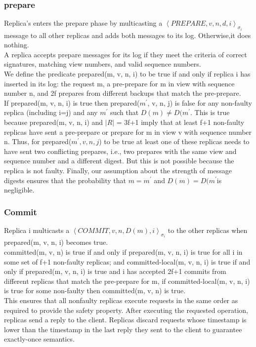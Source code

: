 \documentclass{article}
\begin{document}
\subsubsection{prepare}
Replica's enters the prepare phase by multicasting a $\left\langle PREPARE, v, n, d, i \right\rangle_{\sigma_i} $ message to all other replicas and adds both messages to its log. Otherwise,it does nothing. \\
A replica accepts prepare messages for its log if they meet the criteria of correct signatures, matching view numbers, and valid sequence numbers. \\
We define the predicate prepared(m, v, n, i) to be true
if and only if replica i has inserted in its log: the request
m, a pre-prepare for m in view with sequence number n, and 2f prepares from different backups that match the pre-prepare. \\
If prepared(m, v, n, i) is true then prepared($m^{'}$, v, n, j) is false for any non-faulty replica (including i=j) and any $m^{'}$ such that $D(m) \neq D(m^{'}$. This is true because prepared(m, v, n, i) and $|R|$ = 3f+1 imply that at least f+1 non-faulty replicas
have sent a pre-prepare or prepare for m in view v with
sequence number n. Thus, for prepared($m^{'}, v, n, j$)
to be true at least one of these replicas needs to have
sent two conflicting prepares, i.e., two prepares with the same view and sequence number and a different digest. But this is
not possible because the replica is not faulty. Finally, our
assumption about the strength of message digests ensures
that the probability that $m = m^{'}$ and $D(m) = D(m^{'}$is
negligible.
\subsubsection{Commit}
Replica i multicasts a $\left\langle COMMIT, v, n, D(m), i \right\rangle_{\sigma_i} $ to the other replicas when prepared(m, v, n, i) becomes true. \\
committed(m, v, n) is true if and only
if prepared(m, v, n, i) is true for all i in some set of
f+1 non-faulty replicas; and committed-local(m, v, n, i)
is true if and only if prepared(m, v, n, i) is true and i has
accepted 2f+1 commits from different replicas that match the pre-prepare for m, if committed-local(m, v, n, i) is true for some non-faulty then committed(m, v, n) is true. \\
This ensures that all nonfaulty replicas execute requests in the same order as
required to provide the safety property. After executing
the requested operation, replicas send a reply to the client.
Replicas discard requests whose timestamp is lower than
the timestamp in the last reply they sent to the client to
guarantee exactly-once semantics.
\end{document}

